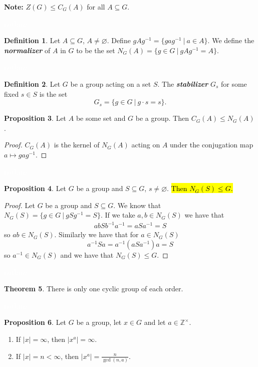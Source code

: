 \documentclass{article}
\theoremstyle{definition}
\newtheorem{thm}{Theorem}[section]
\newtheorem{prop}[thm]{Proposition}
\newtheorem{defn}[thm]{Definition}
\newcommand{\nl}{\textcolor{white}{nothing}}
\newcommand{\seq}{\subseteq}
\newcommand{\inv}{^{-1}}
\newcommand{\Z}{\mathbb{Z}}
\newcommand{\es}{\varnothing}
\begin{document}
\textbf{Note:} $Z(G) \leq C_G(A)$ for all $A\seq G$.

\nl

\begin{defn}
Let $A\seq G$, $A\neq\es$. Define $gAg^{-1} = \{gag^{-1}\ |\ a\in A\}$. We define the \textit{\textbf{normalizer}} of $A$ in $G$ to be the set $N_G(A) = \{g\in G\ |\ gAg^{-1} = A\}$.
\end{defn}
\nl

\begin{defn}
Let $G$ be a group acting on a set $S$. The \textit{\textbf{stabilizer}} $G_s$ for some fixed $s\in S$ is the set 
\[G_s = \{g\in G\ |\ g\cdot s = s\}.\]
\end{defn}

\begin{prop}
Let $A$ be some set and $G$ be a group. Then $C_G(A)\leq N_G(A)$.
\end{prop}
\begin{proof}
$C_G(A)$ is the kernel of $N_G(A)$ acting on $A$ under the conjugation map $a\mapsto gag^{-1}$.
\end{proof}

\nl

\begin{prop}
Let $G$ be a group and $S\seq G$, $s\neq \es$. \hl{Then $N_G(S) \leq G$.}
\end{prop}

\begin{proof}
Let $G$ be a group and $S\seq G$. We know that $N_G(S) = \{g \in G\ |\ gSg\inv = S\}$. If we take $a, b\in N_G(S)$ we have that 
\begin{align*}
abSb\inv a\inv = aSa\inv = S
\end{align*}
so $ab \in N_G(S)$. Similarly we have that for $a\in N_G(S)$
\[a\inv Sa = a\inv(aSa\inv)a = S\]
so $a\inv \in N_G(S)$ and we have that $N_G(S) \leq G$.
\end{proof}

\nl
\begin{thm}
There is only one cyclic group of each order.
\end{thm}

\nl
\begin{prop}
Let $G$ be a group, let $x\in G$ and let $a\in \Z^\times$.
\begin{enumerate}
\item If $|x|=\infty$, then $|x^a| = \infty$.
\item If $|x| = n< \infty$, then $|x^a| = \frac{n}{\gcd(n,a)}$.
\end{enumerate}
\end{prop}
\end{document}
